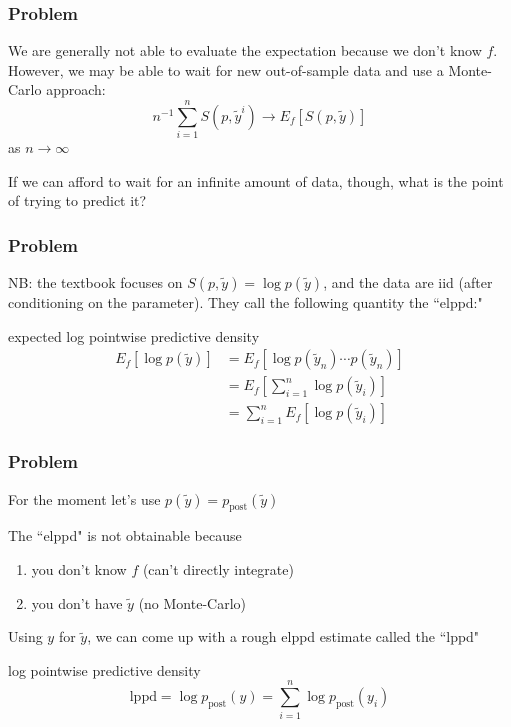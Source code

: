 \documentclass{beamer}
\begin{document}
\begin{frame}
\frametitle{Problem}


We are generally not able to evaluate the expectation because we don't know $f$. However, we may be able to wait for new out-of-sample data and use a Monte-Carlo approach:
\[
n^{-1}\sum_{i=1}^{n} S(p,\tilde{y}^i) \to E_f[S(p,\tilde{y})]
\]
as $n \to \infty$
\newline
\pause

If we can afford to wait for an infinite amount of data, though, what is the point of trying to predict it?

\end{frame}



\begin{frame}
\frametitle{Problem}

NB: the textbook focuses on $S(p,\tilde{y}) = \log p(\tilde{y})$, and the data are iid (after conditioning on the parameter). They call the following quantity the ``elppd:"

\begin{block}{expected log pointwise predictive density}
\begin{align*}
E_f[\log p(\tilde{y})] &= E_f[\log p(\tilde{y}_n)\cdots p(\tilde{y}_n)] \\
&= E_f\left[\sum_{i=1}^n \log p(\tilde{y}_i) \right] \\
&= \sum_{i=1}^nE_f\left[ \log p(\tilde{y}_i) \right]
\end{align*}
\end{block}

\end{frame}

\begin{frame}
\frametitle{Problem}

For the moment let's use $p(\tilde{y}) = p_{\text{post}}(\tilde{y})$
\newline

The ``elppd" is not obtainable because
\begin{enumerate}
\item you don't know $f$ (can't directly integrate)
\item you don't have $\tilde{y}$ (no Monte-Carlo)
\end{enumerate}
\pause

Using $y$ for $\tilde{y}$, we can come up with a rough elppd estimate called the ``lppd"
\begin{block}{log pointwise predictive density}
\[
\text{lppd} = \log p_{\text{post}}(y) = \sum_{i=1}^n \log p_{\text{post}}(y_i) 
\]
\end{block}



\end{frame}
\end{document}
